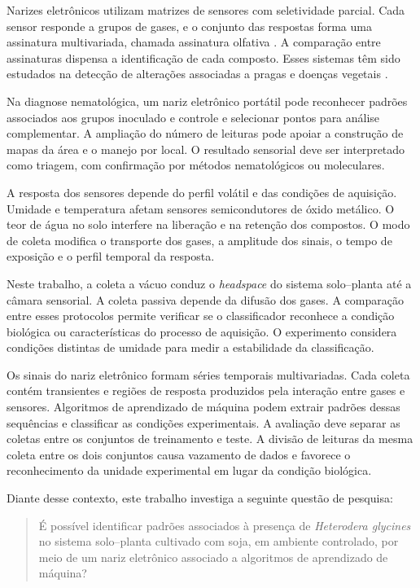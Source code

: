 Narizes eletrônicos utilizam matrizes de sensores com seletividade parcial. Cada sensor responde a grupos de gases, e o conjunto das respostas forma uma assinatura multivariada, chamada assinatura olfativa \cite{berna2010}. A comparação entre assinaturas dispensa a identificação de cada composto. Esses sistemas têm sido estudados na detecção de alterações associadas a pragas e doenças vegetais \cite{cui2018}.

Na diagnose nematológica, um nariz eletrônico portátil pode reconhecer padrões associados aos grupos inoculado e controle e selecionar pontos para análise complementar. A ampliação do número de leituras pode apoiar a construção de mapas da área e o manejo por local. O resultado sensorial deve ser interpretado como triagem, com confirmação por métodos nematológicos ou moleculares.

A resposta dos sensores depende do perfil volátil e das condições de aquisição. Umidade e temperatura afetam sensores semicondutores de óxido metálico. O teor de água no solo interfere na liberação e na retenção dos compostos. O modo de coleta modifica o transporte dos gases, a amplitude dos sinais, o tempo de exposição e o perfil temporal da resposta.

Neste trabalho, a coleta a vácuo conduz o \textit{headspace} do sistema solo--planta até a câmara sensorial. A coleta passiva depende da difusão dos gases. A comparação entre esses protocolos permite verificar se o classificador reconhece a condição biológica ou características do processo de aquisição. O experimento considera condições distintas de umidade para medir a estabilidade da classificação.

Os sinais do nariz eletrônico formam séries temporais multivariadas. Cada coleta contém transientes e regiões de resposta produzidos pela interação entre gases e sensores. Algoritmos de aprendizado de máquina podem extrair padrões dessas sequências e classificar as condições experimentais. A avaliação deve separar as coletas entre os conjuntos de treinamento e teste. A divisão de leituras da mesma coleta entre os dois conjuntos causa vazamento de dados e favorece o reconhecimento da unidade experimental em lugar da condição biológica.

Diante desse contexto, este trabalho investiga a seguinte questão de pesquisa:

\begin{quote}
É possível identificar padrões associados à presença de \textit{Heterodera glycines} no sistema solo--planta cultivado com soja, em ambiente controlado, por meio de um nariz eletrônico associado a algoritmos de aprendizado de máquina?
\end{quote}

